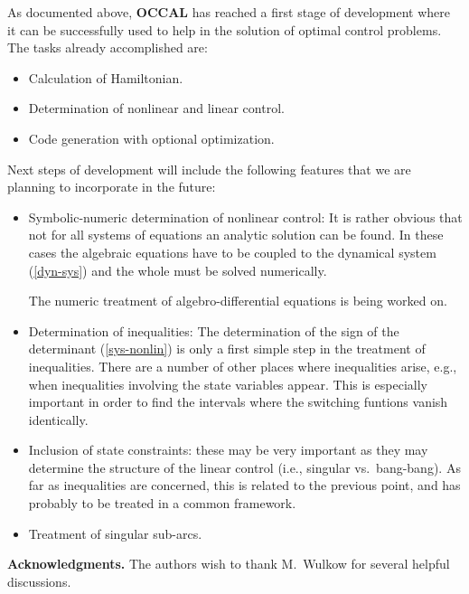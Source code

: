 \documentclass[12pt,a4paper]{article}
\newcommand{\OCCAL}{{\sf\bf OCCAL}}
\begin{document}
As documented above, \OCCAL{} has reached a first stage of
development where it can be successfully used to help in the solution
of optimal control problems. The tasks already accomplished are:
\begin{itemize}
  \item Calculation of Hamiltonian.
  \item Determination of nonlinear and linear control.
  \item Code generation with optional optimization.
\end{itemize}
Next steps of development will include the following features that we
are planning to incorporate in the future:
\begin{itemize}
  \item Symbolic-numeric determination of nonlinear control: It is rather obvious
        that not for all systems of equations an analytic solution can
        be found. In these cases the algebraic equations have to be
        coupled to the dynamical system (\ref{dyn-sys}) and the whole
        must be solved numerically.

        The numeric treatment of algebro-differential equations is
        being worked on.

  \item Determination of inequalities: The determination of the sign
        of the determinant (\ref{sys-nonlin}) is only a first simple
        step in the treatment of inequalities. There are a number of
        other places where inequalities arise, e.g., when inequalities
        involving the state variables appear. This is especially
        important in order to find the intervals where the switching
        funtions vanish identically. 

  \item Inclusion of state constraints: these may be very important as
        they may determine the structure of the linear control (i.e.,
        singular vs.\ bang-bang). As far as inequalities are
        concerned, this is related to the previous point, and has
        probably to be treated in a common framework.

  \item Treatment of singular sub-arcs.
\end{itemize}



\noindent
{\bf Acknowledgments.} The authors wish to thank M.~Wulkow for several
helpful discussions.
\end{document}
